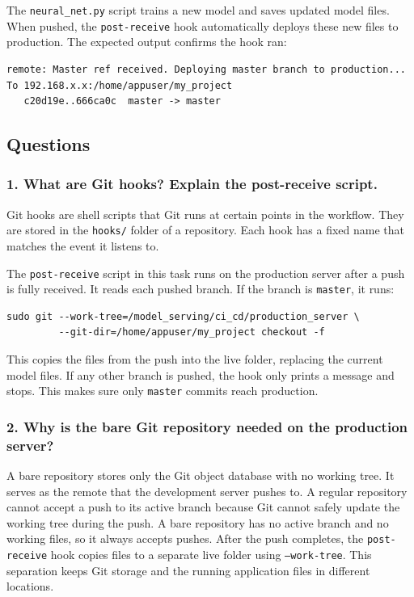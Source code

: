 \documentclass[11pt,a4paper]{article}
\begin{document}
The \texttt{neural\_net.py} script trains a new model and saves updated model files.
When pushed, the \texttt{post-receive} hook automatically deploys these new files
to production. The expected output confirms the hook ran:

\begin{lstlisting}[style=shell]
remote: Master ref received. Deploying master branch to production...
To 192.168.x.x:/home/appuser/my_project
   c20d19e..666ca0c  master -> master
\end{lstlisting}

\subsection{Questions}

\subsubsection*{1. What are Git hooks? Explain the post-receive script.}

Git hooks are shell scripts that Git runs at certain points in the workflow. They
are stored in the \texttt{hooks/} folder of a repository. Each hook has a fixed
name that matches the event it listens to.

The \texttt{post-receive} script in this task runs on the production server after a
push is fully received. It reads each pushed branch. If the branch is
\texttt{master}, it runs:

\begin{lstlisting}[style=shell]
sudo git --work-tree=/model_serving/ci_cd/production_server \
         --git-dir=/home/appuser/my_project checkout -f
\end{lstlisting}

This copies the files from the push into the live folder, replacing the current
model files. If any other branch is pushed, the hook only prints a message and
stops. This makes sure only \texttt{master} commits reach production.

\subsubsection*{2. Why is the bare Git repository needed on the production server?}

A bare repository stores only the Git object database with no working tree.
It serves as the remote that the development server pushes to.
A regular repository cannot accept a push to its active branch because Git
cannot safely update the working tree during the push.
A bare repository has no active branch and no working files, so it always
accepts pushes. After the push completes, the \texttt{post-receive} hook copies
files to a separate live folder using \texttt{--work-tree}.
This separation keeps Git storage and the running application files in
different locations.
\end{document}
